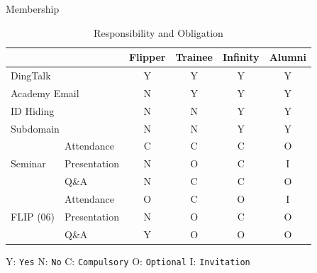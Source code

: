 \begin{slide}{Membership}
	\begin{table}[htp]
		\caption{Responsibility and Obligation}
		\begin{center}
			\begin{threeparttable}
				\begin{tabular}{ll|c|c|c|c}
					\toprule
					 			&		& \textbf{Flipper} & \textbf{Trainee} & \textbf{Infinity}  & \textbf{Alumni}\\ 
					\midrule
					\multicolumn{2}{l|}{DingTalk} 						& Y & Y & Y & Y\\
					\multicolumn{2}{l|}{Academy Email} 					& N & Y & Y & Y\\
					\multicolumn{2}{l|}{ID Hiding}	 					& N & N & Y & Y\\
					\multicolumn{2}{l|}{Subdomain} 						& N & N & Y & Y\\ 
					\midrule
					\multirow{3}{*}{Seminar}  		& Attendance			& C & C & C & O\\
													& Presentation 		& N & O & C & I\\
													& Q\&A 	 			& N & C & C & O\\
					\midrule
					\multirow{3}{*}{FLIP (06)}  		& Attendance 		& O & C & O & I \\
					 								& Presentation 		& N & O & C & O \\
													& Q\&A 				& Y & O & O & O \\
					 \bottomrule
				\end{tabular}
				\begin{tablenotes}
					\item Y: \texttt{Yes} \quad N: \texttt{No} \quad
					 C: \texttt{Compulsory} \quad O: \texttt{Optional} \quad I: \texttt{Invitation}
				\end{tablenotes}
			\end{threeparttable}
		\end{center}
	\end{table}
\end{slide}

